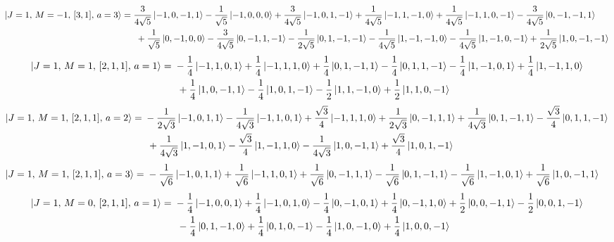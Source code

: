 \documentclass{article}
\begin{document}
{\small
\begin{equation*}
\begin{aligned}
\ket{J=1,\,M=-1,\,[3,1],\,a=3} = \; &\frac{3}{4\sqrt{5}} \ket{-1,0,-1,1} - \frac{1}{\sqrt{5}} \ket{-1,0,0,0} + \frac{3}{4\sqrt{5}} \ket{-1,0,1,-1} + \frac{1}{4\sqrt{5}} \ket{-1,1,-1,0} + \frac{1}{4\sqrt{5}} \ket{-1,1,0,-1} - \frac{3}{4\sqrt{5}} \ket{0,-1,-1,1} \\
  & \; + \frac{1}{\sqrt{5}} \ket{0,-1,0,0} - \frac{3}{4\sqrt{5}} \ket{0,-1,1,-1} - \frac{1}{2\sqrt{5}} \ket{0,1,-1,-1} - \frac{1}{4\sqrt{5}} \ket{1,-1,-1,0} - \frac{1}{4\sqrt{5}} \ket{1,-1,0,-1} + \frac{1}{2\sqrt{5}} \ket{1,0,-1,-1}
\end{aligned}
\end{equation*}}
{\small
\begin{equation*}
\begin{aligned}
\ket{J=1,\,M=1,\,[2,1,1],\,a=1} = \; &- \frac{1}{4} \ket{-1,1,0,1} + \frac{1}{4} \ket{-1,1,1,0} + \frac{1}{4} \ket{0,1,-1,1} - \frac{1}{4} \ket{0,1,1,-1} - \frac{1}{4} \ket{1,-1,0,1} + \frac{1}{4} \ket{1,-1,1,0} \\
  & \; + \frac{1}{4} \ket{1,0,-1,1} - \frac{1}{4} \ket{1,0,1,-1} - \frac{1}{2} \ket{1,1,-1,0} + \frac{1}{2} \ket{1,1,0,-1}
\end{aligned}
\end{equation*}}
{\small
\begin{equation*}
\begin{aligned}
\ket{J=1,\,M=1,\,[2,1,1],\,a=2} = \; &- \frac{1}{2\sqrt{3}} \ket{-1,0,1,1} - \frac{1}{4\sqrt{3}} \ket{-1,1,0,1} + \frac{\sqrt{3}}{4} \ket{-1,1,1,0} + \frac{1}{2\sqrt{3}} \ket{0,-1,1,1} + \frac{1}{4\sqrt{3}} \ket{0,1,-1,1} - \frac{\sqrt{3}}{4} \ket{0,1,1,-1} \\
  & \; + \frac{1}{4\sqrt{3}} \ket{1,-1,0,1} - \frac{\sqrt{3}}{4} \ket{1,-1,1,0} - \frac{1}{4\sqrt{3}} \ket{1,0,-1,1} + \frac{\sqrt{3}}{4} \ket{1,0,1,-1}
\end{aligned}
\end{equation*}}
\begin{equation*}
\begin{aligned}
\ket{J=1,\,M=1,\,[2,1,1],\,a=3} = \; &- \frac{1}{\sqrt{6}} \ket{-1,0,1,1} + \frac{1}{\sqrt{6}} \ket{-1,1,0,1} + \frac{1}{\sqrt{6}} \ket{0,-1,1,1} - \frac{1}{\sqrt{6}} \ket{0,1,-1,1} - \frac{1}{\sqrt{6}} \ket{1,-1,0,1} + \frac{1}{\sqrt{6}} \ket{1,0,-1,1}
\end{aligned}
\end{equation*}
{\small
\begin{equation*}
\begin{aligned}
\ket{J=1,\,M=0,\,[2,1,1],\,a=1} = \; &- \frac{1}{4} \ket{-1,0,0,1} + \frac{1}{4} \ket{-1,0,1,0} - \frac{1}{4} \ket{0,-1,0,1} + \frac{1}{4} \ket{0,-1,1,0} + \frac{1}{2} \ket{0,0,-1,1} - \frac{1}{2} \ket{0,0,1,-1} \\
  & \; - \frac{1}{4} \ket{0,1,-1,0} + \frac{1}{4} \ket{0,1,0,-1} - \frac{1}{4} \ket{1,0,-1,0} + \frac{1}{4} \ket{1,0,0,-1}
\end{aligned}
\end{equation*}}
\end{document}

